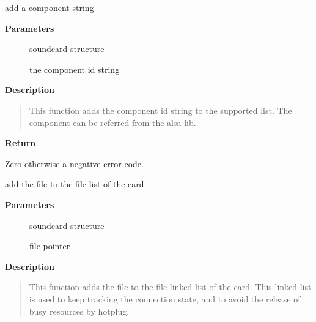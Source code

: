 \documentclass[a4paper,8pt,english]{sphinxmanual}
\begin{document}
\begin{fulllineitems}
\label{sound/kernel-api/alsa-driver-api:c.snd_component_add}
add a component string

\end{fulllineitems}


\textbf{Parameters}
\begin{description}
\item[{}] \leavevmode
soundcard structure

\item[{}] \leavevmode
the component id string

\end{description}

\textbf{Description}
\begin{quote}

This function adds the component id string to the supported list.
The component can be referred from the alsa-lib.
\end{quote}

\textbf{Return}

Zero otherwise a negative error code.

\begin{fulllineitems}
\label{sound/kernel-api/alsa-driver-api:c.snd_card_file_add}
add the file to the file list of the card

\end{fulllineitems}


\textbf{Parameters}
\begin{description}
\item[{}] \leavevmode
soundcard structure

\item[{}] \leavevmode
file pointer

\end{description}

\textbf{Description}
\begin{quote}

This function adds the file to the file linked-list of the card.
This linked-list is used to keep tracking the connection state,
and to avoid the release of busy resources by hotplug.
\end{quote}
\end{document}
